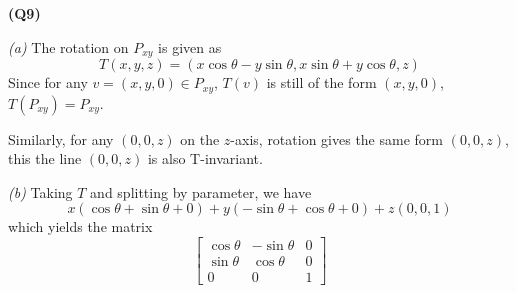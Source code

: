 \documentclass[12pt, a4paper]{article}
\begin{document}
\textbf{(Q9)}

\textit{(a)}
The rotation on $P_{xy}$ is given as
\[
    T(x, y, z) = (x\cos\theta - y\sin\theta,
    x\sin\theta + y\cos\theta, z)
\]
Since for any $v = (x, y, 0) \in P_{xy}$, $T(v)$ is still of the form
$(x, y, 0)$, $T(P_{xy}) = P_{xy}$.

Similarly, for any $(0, 0, z)$ on the $z$-axis, rotation gives the
same form $(0, 0, z)$, this the line $(0, 0, z)$ is also T-invariant.

\textit{(b)}
Taking $T$ and splitting by parameter, we have
\[
    x(\cos\theta + \sin\theta + 0)+
    y(-\sin\theta + \cos\theta + 0)+
    z(0, 0, 1)
\]
which yields the matrix
\[
    \begin{bmatrix}
        \cos\theta & -\sin\theta & 0 \\
        \sin\theta &  \cos\theta & 0 \\
             0     &       0     & 1
    \end{bmatrix}
\]
\end{document}
